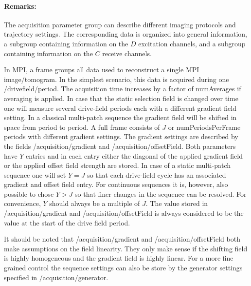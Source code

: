 \documentclass[landscape,a4paper]{article} %
\newcommand{\inlvar}[1]{{\ttfamily#1}}
\begin{document}
\begin{multicols}{2}
\paragraph{Remarks:} The acquisition parameter group can describe different imaging protocols and trajectory settings. The corresponding data is organized into general information, a subgroup containing information on the $D$ excitation channels, and a subgroup containing information on the $C$ receive channels.

In MPI, a frame groups all data used to reconstruct a single MPI image/tomogram. In the simplest scenario, this data is acquired during one \inlvar{/drivefield/period}. The acquisition time increases by a factor of \inlvar{numAverages} if averaging is applied. In case that the static selection field is changed over time one will measure several drive-field periods each with a different gradient field setting. In a classical multi-patch sequence the gradient field will be shifted in space from period to period. A full frame consists of $J$ or \inlvar{numPeriodsPerFrame} periods with different gradient settings. The gradient settings are described by the fields \inlvar{/acquisition/gradient} and \inlvar{/acquisition/offsetField}. Both parameters have $Y$ entries and in each entry either the diagonal of the applied gradient field or the applied offset field strength are stored. In case of a static multi-patch sequence one will set $Y=J$ so that each drive-field cycle has an associated gradient and offset field entry. For continuous sequences it is, however, also possible to chose $Y>J$ so that finer changes in the sequence can be resolved. For convenience, $Y$ should always be a multiple of $J$. The value stored in \inlvar{/acquisition/gradient} and \inlvar{/acquisition/offsetField} is always considered to be the value at the start of the drive field period.

It should be noted that \inlvar{/acquisition/gradient} and \inlvar{/acquisition/offsetField} both make assumptions on the field linearity. They only make sense if the shifting field is highly homogeneous and the gradient field is highly linear. For a more fine grained control the sequence settings can also be store by the generator settings specified in \inlvar{/acquisition/generator}.


\end{multicols}
\end{document}
